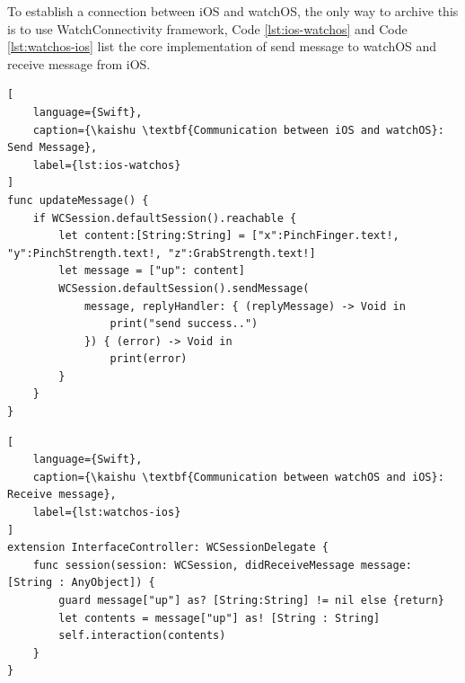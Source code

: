 To establish a connection between iOS and watchOS, the only way to archive this is to use WatchConnectivity framework, Code \ref{lst:ios-watchos} and Code \ref{lst:watchos-ios} list the core implementation of send message to watchOS and receive message from iOS.

\begin{lstlisting}[
    language={Swift},
    caption={\kaishu \textbf{Communication between iOS and watchOS}: Send Message},
    label={lst:ios-watchos}
]
func updateMessage() {
    if WCSession.defaultSession().reachable {
        let content:[String:String] = ["x":PinchFinger.text!, "y":PinchStrength.text!, "z":GrabStrength.text!]
        let message = ["up": content]
        WCSession.defaultSession().sendMessage(
            message, replyHandler: { (replyMessage) -> Void in
                print("send success..")
            }) { (error) -> Void in
                print(error)
        }
    }
}
\end{lstlisting}
\begin{lstlisting}[
    language={Swift},
    caption={\kaishu \textbf{Communication between watchOS and iOS}: Receive message},
    label={lst:watchos-ios}
]
extension InterfaceController: WCSessionDelegate {
    func session(session: WCSession, didReceiveMessage message: [String : AnyObject]) {
        guard message["up"] as? [String:String] != nil else {return}
        let contents = message["up"] as! [String : String]
        self.interaction(contents)
    }
}
\end{lstlisting}

\cleardoublepage
